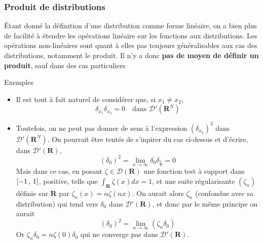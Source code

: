         \subsubsection{Produit de distributions}

        Étant donné la définition d’une distribution comme forme linéaire, on a bien plus de facilité à étendre les opérations linéaire sur les fonctions aux distributions. Les opérations non-linéaires sont quant à elles pas toujours généralisables aux cas des distributions, notamment le produit. Il n’y a donc \textbf{pas de moyen de définir un produit}, sauf dans des cas particuliers

        \begin{demo}{Exemples}
            \begin{itemize}
                \item Il est tout à fait naturel de considérer que, si $x_1 \neq x_2$,
                \[ \delta_{x_1} \delta_{x_2} = 0 \quad \text{dans } \mathcal{D}'(\mathbf{R}^N) \]   
                \item Toutefois, on ne peut pas donner de sens à l’expression $(\delta_{x_0})^2$ dans $\mathcal{D}'(\mathbf{R}^N)$. On pourrait être tentés de s’inpirer du cas ci-dessus et d’écrire, dans $\mathcal{D}'(\mathbf{R})$,
                \[ (\delta_0)^2 = \lim_{n \to \infty} \delta_0 \delta_{\frac{1}{n}} = 0 \]   
                Mais dans ce cas, en posant $\zeta \in \mathcal{D}(\mathbf{R})$ une fonction test à support dans $\left[ -1 \, , \, 1 \right]$, positive, telle que $\int_{\mathbf{R}} \zeta(x)dx = 1$, et une suite régularisante $(\zeta_n)$ définie sur $\mathbf{R}$ par $\zeta_n(x) = n \zeta(nx)$. On aurait alors $\zeta_n$ (confondue avec sa distribution) qui tend vers $\delta_0$ dans $\mathcal{D}'(\mathbf{R})$, et donc par le même principe on aurait 
                \[ (\delta_0)^2 = \lim_{n \to \infty} (\zeta_n \delta_0) \]   
                Or $\zeta_n \delta_0 = n \zeta(0) \delta_0$ qui ne converge pas dans $\mathcal{D}'(\mathbf{R})$.
            \end{itemize}  
         \end{demo}


        